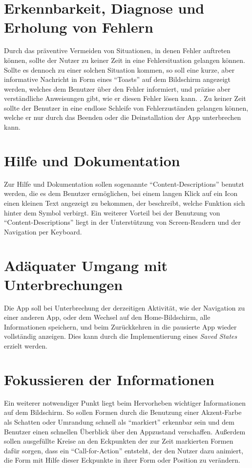 \section{Erkennbarkeit, Diagnose und Erholung von Fehlern}
Durch das präventive Vermeiden von Situationen, in denen Fehler auftreten können, sollte der Nutzer zu keiner Zeit in eine Fehlersituation gelangen können.
Sollte es dennoch zu einer solchen Situation kommen, so soll eine kurze, aber informative Nachricht in Form eines ``Toasts'' auf dem Bildschirm angezeigt werden, welches dem Benutzer über den Fehler informiert, und präzise aber verständliche Anweisungen gibt, wie er diesen Fehler lösen kann.
.
Zu keiner Zeit sollte der Benutzer in eine endlose Schleife von Fehlerzuständen gelangen können, welche er nur durch das Beenden oder die Deinstallation der App unterbrechen kann.

\section{Hilfe und Dokumentation}
Zur Hilfe und Dokumentation sollen sogenannte ``Content-Descriptions'' benutzt werden, die es dem Benutzer ermöglichen, bei einem langen Klick auf ein Icon einen kleinen Text angezeigt zu bekommen, der beschreibt, welche Funktion sich hinter dem Symbol verbirgt.
Ein weiterer Vorteil bei der Benutzung von ``Content-Descriptions'' liegt in der Unterstützung von Screen-Readern und der Navigation per Keyboard.

\section{Adäquater Umgang mit Unterbrechungen}
Die App soll bei Unterbrechung der derzeitigen Aktivität, wie der Navigation zu einer anderen App, oder dem Wechsel auf den Home-Bildschirm, alle Informationen speichern, und beim Zurückkehren in die pausierte App wieder vollständig anzeigen.
Dies kann durch die Implementierung eines \emph{Saved States} erzielt werden.

\section{Fokussieren der Informationen}
Ein weiterer notwendiger Punkt liegt beim Hervorheben wichtiger Informationen auf dem Bildschirm.
So sollen Formen durch die Benutzung einer Akzent-Farbe als Schatten oder Umrandung schnell als ``markiert'' erkennbar sein und dem Benutzer einen schnellen Überblick über den Appzustand verschaffen.
Außerdem sollen ausgefüllte Kreise an den Eckpunkten der zur Zeit markierten Formen dafür sorgen, dass ein ``Call-for-Action'' entsteht, der den Nutzer dazu animiert, die Form mit Hilfe dieser Eckpunkte in ihrer Form oder Position zu verändern.

